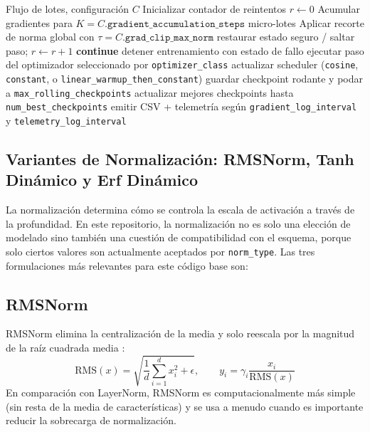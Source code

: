 \documentclass[11pt,a4paper]{article}
\begin{document}
\begin{algorithm}[t]
\caption{Paso de Entrenamiento Guiado por Esquema con Controles de Estabilidad}
\begin{algorithmic}[1]
\Require Flujo de lotes, configuración $C$
\State Inicializar contador de reintentos $r\gets 0$
    \State Acumular gradientes para $K=C.\texttt{gradient\_accumulation\_steps}$ micro-lotes
    \State Aplicar recorte de norma global con $\tau=C.\texttt{grad\_clip\_max\_norm}$
            \State restaurar estado seguro / saltar paso; $r \gets r+1$
            \State \textbf{continue}
        \Else
            \State detener entrenamiento con estado de fallo
        \EndIf
    \EndIf
    \State ejecutar paso del optimizador seleccionado por \texttt{optimizer\_class}
    \State actualizar scheduler (\texttt{cosine}, \texttt{constant}, o \texttt{linear\_warmup\_then\_constant})
        \State guardar checkpoint rodante y podar a \texttt{max\_rolling\_checkpoints}
    \EndIf
    \State actualizar mejores checkpoints hasta \texttt{num\_best\_checkpoints}
    \State emitir CSV + telemetría según \texttt{gradient\_log\_interval} y \texttt{telemetry\_log\_interval}
\EndFor
\end{algorithmic}
\end{algorithm}

\subsection{Variantes de Normalización: RMSNorm, Tanh Dinámico y Erf Dinámico}
\label{sec:normalization}

La normalización determina cómo se controla la escala de activación a través de la profundidad. En este repositorio, la normalización no es solo una elección de modelado sino también una cuestión de compatibilidad con el esquema, porque solo ciertos valores son actualmente aceptados por \texttt{norm\_type}. Las tres formulaciones más relevantes para este código base son:

\subsection{RMSNorm}
RMSNorm elimina la centralización de la media y solo reescala por la magnitud de la raíz cuadrada media \citep{zhang_root_2019}:
\[
\mathrm{RMS}(x)=\sqrt{\frac{1}{d}\sum_{i=1}^{d}x_i^2+\epsilon},\qquad
y_i=\gamma_i\frac{x_i}{\mathrm{RMS}(x)}
\]
En comparación con LayerNorm, RMSNorm es computacionalmente más simple (sin resta de la media de características) y se usa a menudo cuando es importante reducir la sobrecarga de normalización.
\end{document}
